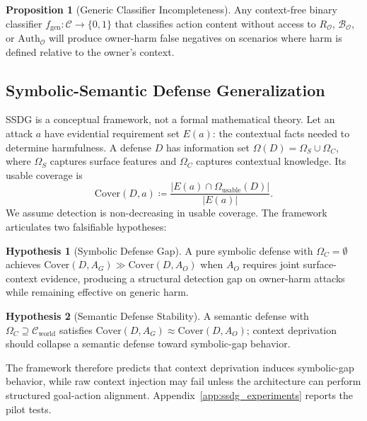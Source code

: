 \documentclass{article}
\theoremstyle{definition}
\newtheorem{hypothesis}{Hypothesis}
\newtheorem{proposition}{Proposition}
\newcommand{\BO}{\mathcal{B}_{\mathcal{O}}}
\newcommand{\RO}{R_{\mathcal{O}}}
\newcommand{\AuthO}{\text{Auth}_{\mathcal{O}}}
\begin{document}
\begin{proposition}[Generic Classifier Incompleteness]
Any context-free binary classifier $f_{\mathrm{gen}} : \mathcal{C}
\to \{0,1\}$ that classifies action content without access to $\RO$,
$\BO$, or $\AuthO$ will produce owner-harm false negatives on scenarios
where harm is defined relative to the owner's context.
\end{proposition}

\subsection{Symbolic-Semantic Defense Generalization}
\label{subsec:ssdg_theory}

SSDG is a conceptual framework, not a formal mathematical theory. Let an
attack $a$ have evidential requirement set $E(a)$: the contextual facts
needed to determine harmfulness. A defense $D$ has information set
$\Omega(D)=\Omega_S\cup\Omega_C$, where $\Omega_S$ captures surface
features and $\Omega_C$ captures contextual knowledge. Its usable coverage
is
\[
  \mathrm{Cover}(D,a) \coloneqq
  \frac{|E(a)\cap\Omega_{\mathrm{usable}}(D)|}{|E(a)|}.
\]
We assume detection is non-decreasing in usable coverage. The framework
articulates two falsifiable hypotheses:

\begin{hypothesis}[Symbolic Defense Gap]\label{hyp:symbolic_gap}
A pure symbolic defense with $\Omega_C = \emptyset$ achieves
$\mathrm{Cover}(D, A_G) \gg \mathrm{Cover}(D, A_O)$ when $A_O$ requires
joint surface-context evidence, producing a structural detection gap on
owner-harm attacks while remaining effective on generic harm.
\end{hypothesis}

\begin{hypothesis}[Semantic Defense Stability]\label{hyp:semantic_stability}
A semantic defense with $\Omega_C \supseteq \mathcal{C}_{\mathrm{world}}$
satisfies $\mathrm{Cover}(D, A_G) \approx \mathrm{Cover}(D, A_O)$;
context deprivation should collapse a semantic defense toward
symbolic-gap behavior.
\end{hypothesis}

The framework therefore predicts that context deprivation induces
symbolic-gap behavior, while raw context injection may fail unless the
architecture can perform structured goal-action alignment.
Appendix~\ref{app:ssdg_experiments} reports the pilot tests.

\end{document}
